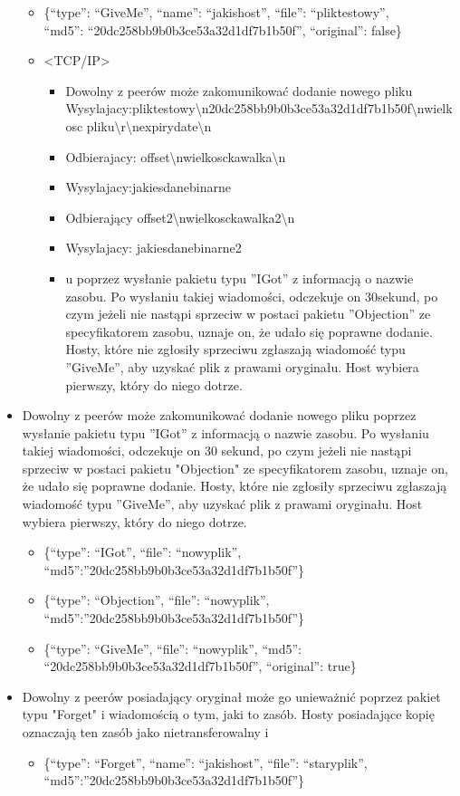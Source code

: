 \documentclass[10pt,a4paper]{article}
\begin{document}
\begin{itemize}
\begin{itemize}
\item \{“type”: “GiveMe”, “name”: “jakishost”, “file”: “pliktestowy”, 
\\“md5”: “20dc258bb9b0b3ce53a32d1df7b1b50f”, “original”: false\}
\item <TCP/IP>
\begin{itemize}
\renewcommand{\labelitemiii}{$\circ$}
\item Dowolny z peerów może zakomunikować dodanie nowego pliku
\\Wysylajacy:pliktestowy\textbackslash n20dc258bb9b0b3ce53a32d1df7b1b50f\textbackslash nwielkosc pliku\textbackslash r\textbackslash nexpirydate\textbackslash n
\item Odbierajacy: offset\textbackslash nwielkosckawalka\textbackslash n
\item Wysylajacy:jakiesdanebinarne
\item Odbierający offset2\textbackslash nwielkosckawalka2\textbackslash n
\item Wysylajacy: jakiesdanebinarne2 
\item u poprzez wysłanie pakietu typu ''IGot'' z informacją o nazwie zasobu. Po wysłaniu takiej wiadomości, odczekuje on 30sekund, po czym jeżeli nie nastąpi sprzeciw w postaci pakietu ''Objection'' ze specyfikatorem zasobu, uznaje on, że udało się poprawne dodanie. Hosty, które nie zgłosiły sprzeciwu zgłaszają wiadomość typu ''GiveMe'', aby uzyskać plik z prawami oryginału. Host wybiera pierwszy, który do niego dotrze.
\end{itemize}
\end{itemize}
\item Dowolny z peerów może zakomunikować dodanie nowego pliku poprzez wysłanie pakietu typu ''IGot'' z informacją o nazwie zasobu. Po wysłaniu takiej wiadomości, odczekuje on 30 sekund, po czym jeżeli nie nastąpi sprzeciw w postaci pakietu "Objection" ze specyfikatorem zasobu, uznaje on, że udało się poprawne dodanie. Hosty, które nie zgłosiły sprzeciwu zgłaszają wiadomość typu ''GiveMe'', aby uzyskać plik z prawami oryginału. Host wybiera pierwszy, który do niego dotrze.
\begin{itemize}
\item \{“type”: “IGot”, “file”: “nowyplik”, “md5”:”20dc258bb9b0b3ce53a32d1df7b1b50f”\}
\item \{“type”: “Objection”, “file”: “nowyplik”, “md5”:”20dc258bb9b0b3ce53a32d1df7b1b50f”\}
\item \{“type”: “GiveMe”, “file”: “nowyplik”, “md5”: “20dc258bb9b0b3ce53a32d1df7b1b50f”, “original”: true\}
\end{itemize}
\item Dowolny z peerów posiadający oryginał może go unieważnić poprzez pakiet typu "Forget" i wiadomością o tym, jaki to zasób. Hosty posiadające kopię oznaczają ten zasób jako nietransferowalny i 
\begin{itemize}
\item \{“type”: “Forget”, “name”: “jakishost”, “file”: “staryplik”, “md5”:”20dc258bb9b0b3ce53a32d1df7b1b50f”\}
\end{itemize}
\end{itemize}
\end{document}
